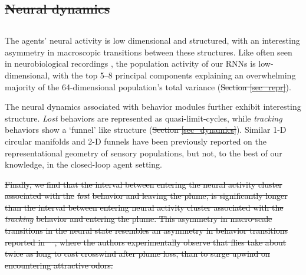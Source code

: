 \documentclass[5p,twocolumn,authoryear]{elsarticle}
\providecommand{\DIFaddtex}[1]{{\protect\color{blue}\uwave{#1}}} %
\providecommand{\DIFdeltex}[1]{{\protect\color{red}\sout{#1}}}                      %
\providecommand{\DIFaddbegin}{} %
\providecommand{\DIFaddend}{} %
\providecommand{\DIFdelbegin}{} %
\providecommand{\DIFdelend}{} %
\providecommand{\DIFadd}[1]{\texorpdfstring{\DIFaddtex{#1}}{#1}} %
\providecommand{\DIFdel}[1]{\texorpdfstring{\DIFdeltex{#1}}{}} %
\newcommand{\DIFscaledelfig}{0.5}
\newlength{\DIFdelgraphicswidth} %
\newlength{\DIFdelgraphicsheight} %
\newcommand{\DIFaddincludegraphics}[2][]{{\color{blue}\fbox{\DIFOincludegraphics[#1]{#2}}}} %
\newcommand{\DIFdelincludegraphics}[2][]{%
\sbox{\DIFdelgraphicsbox}{\DIFOincludegraphics[#1]{#2}}%
\settoboxwidth{\DIFdelgraphicswidth}{\DIFdelgraphicsbox} %
\settoboxtotalheight{\DIFdelgraphicsheight}{\DIFdelgraphicsbox} %
\scalebox{\DIFscaledelfig}{%
\parbox[b]{\DIFdelgraphicswidth}{\usebox{\DIFdelgraphicsbox}\\[-\baselineskip] \rule{\DIFdelgraphicswidth}{0em}}\llap{\resizebox{\DIFdelgraphicswidth}{\DIFdelgraphicsheight}{%
\setlength{\unitlength}{\DIFdelgraphicswidth}%
\begin{picture}(1,1)%
\thicklines\linethickness{2pt} %
{\color[rgb]{1,0,0}\put(0,0){\framebox(1,1){}}}%
{\color[rgb]{1,0,0}\put(0,0){\line( 1,1){1}}}%
{\color[rgb]{1,0,0}\put(0,1){\line(1,-1){1}}}%
\end{picture}%
}\hspace*{3pt}}} %
} %
\DeclareRobustCommand{\DIFaddbegin}{\DIFOaddbegin \let\includegraphics\DIFaddincludegraphics} %
\DeclareRobustCommand{\DIFaddend}{\DIFOaddend \let\includegraphics\DIFOincludegraphics} %
\DeclareRobustCommand{\DIFdelbegin}{\DIFOdelbegin \let\includegraphics\DIFdelincludegraphics} %
\DeclareRobustCommand{\DIFdelend}{\DIFOaddend \let\includegraphics\DIFOincludegraphics} %
\begin{document}
\DIFdelbegin \subsection{\DIFdel{Neural dynamics}}
\addtocounter{subsection}{-1}%
\DIFdelend \DIFaddbegin \subsection*{\DIFadd{Neural dynamics}}
\DIFaddend The agents' neural activity is low dimensional and structured, with an interesting  asymmetry in macroscopic transitions between these structures.
Like often seen in neurobiological recordings \citep{pang2016dimensionality,cunningham2014dimensionality}, the population activity of our RNNs is low-dimensional, with the top 5--8 principal components explaining an overwhelming majority of the 64-dimensional population's total variance (\DIFdelbegin \DIFdel{Section \ref{sec_repr}}\DIFdelend \DIFaddbegin \DIFadd{Figure \ref{fig_representations}g}\DIFaddend ).

The neural dynamics associated with behavior modules further exhibit interesting structure.
\textit{Lost} behaviors are represented as quasi-limit-cycles, while \textit{tracking} behaviors show a `funnel' like structure (\DIFdelbegin \DIFdel{Section \ref{sec_dynamics}}\DIFdelend \DIFaddbegin \DIFadd{Figure \ref{fig_dynamics}}\DIFaddend ).
Similar 1-D circular manifolds and 2-D funnels \citep{vyas2020computation,kriegeskorte2021neural} have been previously reported on the representational geometry of sensory populations, but not, to the best of our knowledge, in the closed-loop agent setting.


\DIFdelbegin \DIFdel{Finally, we find that the interval between entering the neural activity cluster associated with the }\textit{\DIFdel{lost}} %
\DIFdel{behavior and leaving the plume, is significantly longer than the interval between entering neural activity cluster associated with the }\textit{\DIFdel{tracking}} %
\DIFdel{behavior and entering the plume.
This asymmetry in macro-scale transitions in the neural state resembles an asymmetry in behavior transitions reported in \mbox{%
\cite{van2014plume}}\hspace{0pt}%
, where the authors experimentally observe that flies take about twice as long to cast crosswind after plume loss, than to surge upwind on encountering attractive odors.
}\DIFdelend %
\end{document}
